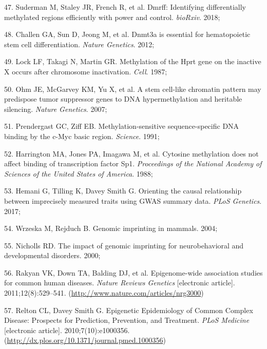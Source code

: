\documentclass[11pt,oneside]{bristolthesis}
\newenvironment{cslreferences}%
  {}%
  {\par}
\begin{document}
\begin{cslreferences}
\leavevmode\hypertarget{ref-Suderman2018}{}%
47. Suderman M, Staley JR, French R, et al. Dmrff: Identifying differentially methylated regions efficiently with power and control. \emph{bioRxiv}. 2018;

\leavevmode\hypertarget{ref-Challen2012}{}%
48. Challen GA, Sun D, Jeong M, et al. Dnmt3a is essential for hematopoietic stem cell differentiation. \emph{Nature Genetics}. 2012;

\leavevmode\hypertarget{ref-Lock1987}{}%
49. Lock LF, Takagi N, Martin GR. Methylation of the Hprt gene on the inactive X occurs after chromosome inactivation. \emph{Cell}. 1987;

\leavevmode\hypertarget{ref-Ohm2007}{}%
50. Ohm JE, McGarvey KM, Yu X, et al. A stem cell-like chromatin pattern may predispose tumor suppressor genes to DNA hypermethylation and heritable silencing. \emph{Nature Genetics}. 2007;

\leavevmode\hypertarget{ref-Prendergast1991}{}%
51. Prendergast GC, Ziff EB. Methylation-sensitive sequence-specific DNA binding by the c-Myc basic region. \emph{Science}. 1991;

\leavevmode\hypertarget{ref-Harrington1988}{}%
52. Harrington MA, Jones PA, Imagawa M, et al. Cytosine methylation does not affect binding of transcription factor Sp1. \emph{Proceedings of the National Academy of Sciences of the United States of America}. 1988;

\leavevmode\hypertarget{ref-Hemani2017}{}%
53. Hemani G, Tilling K, Davey Smith G. Orienting the causal relationship between imprecisely measured traits using GWAS summary data. \emph{PLoS Genetics}. 2017;

\leavevmode\hypertarget{ref-Wrzeska2004}{}%
54. Wrzeska M, Rejduch B. Genomic imprinting in mammals. 2004;

\leavevmode\hypertarget{ref-Nicholls2000}{}%
55. Nicholls RD. The impact of genomic imprinting for neurobehavioral and developmental disorders. 2000;

\leavevmode\hypertarget{ref-Rakyan2011}{}%
56. Rakyan VK, Down TA, Balding DJ, et al. Epigenome-wide association studies for common human diseases. \emph{Nature Reviews Genetics} {[}electronic article{]}. 2011;12(8):529--541. (\url{http://www.nature.com/articles/nrg3000})

\leavevmode\hypertarget{ref-Relton2010}{}%
57. Relton CL, Davey Smith G. Epigenetic Epidemiology of Common Complex Disease: Prospects for Prediction, Prevention, and Treatment. \emph{PLoS Medicine} {[}electronic article{]}. 2010;7(10):e1000356. (\url{http://dx.plos.org/10.1371/journal.pmed.1000356})


\end{cslreferences}
\end{document}

